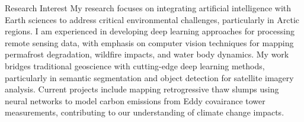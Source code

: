 \documentclass{resume} %
\begin{document}
\begin{rSection}{Research Interest}
My research focuses on integrating artificial intelligence with Earth sciences to address critical environmental challenges, particularly in Arctic regions. I am experienced in developing deep learning approaches for processing remote sensing data, with emphasis on computer vision techniques for mapping permafrost degradation, wildfire impacts, and water body dynamics. My work bridges traditional geoscience with cutting-edge deep learning methods, particularly in semantic segmentation and object detection for satellite imagery analysis. Current projects include mapping retrogressive thaw slumps using neural networks to model carbon emissions from Eddy covairance tower measurements, contributing to our understanding of climate change impacts.
\end{rSection}
\end{document}
